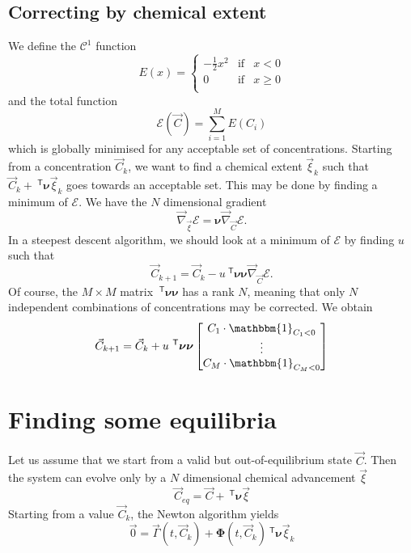 \documentclass[aps]{revtex4}
\newcommand{\mymat}[1]{\bm{#1}}
\newcommand{\mytrn}[1]{~^{\mathsf{T}}{#1}}
\newcommand{\mygrad}{\vec{\nabla}}
\begin{document}
\subsection{Correcting by chemical extent}
We define the $\mathcal{C}^1$ function
$$
	E(x) = \left\lbrace
	\begin{array}{rcl}
	-\frac{1}{2} x^2 & \text{if} & x<0\\
	0                & \text{if} & x\geq0\\
	\end{array}
	\right.
$$
and the total function
$$
	\mathcal{E}(\vec{C}) = \sum_{i=1}^M E(C_i)
$$
which is globally minimised for any acceptable set of concentrations.
Starting from a concentration $\vec{C}_k$, we want to find a chemical extent $\vec{\xi}_k$ such that
$\vec{C}_k + \mytrn{\mymat{\nu}}\vec{\xi}_k$ goes towards an acceptable set.
This may be done by finding a minimum of $\mathcal{E}$.
We have the $N$ dimensional gradient
$$
	\mygrad_{\vec{\xi}} \mathcal{E} = \mymat{\nu} \mygrad_{\vec{C}} \mathcal{E}.
$$
In a steepest descent algorithm, we should look at a minimum of $\mathcal{E}$
by finding $u$ such that
$$
	\vec{C}_{k+1} = \vec{C}_{k} - u \mytrn{\mymat{\nu}} \mymat{\nu} \mygrad_{\vec{C}} \mathcal{E}.
$$
Of course, the $M\times M$ matrix $\mytrn{\mymat{\nu}} \mymat{\nu}$ has a rank $N$, meaning that
only $N$ independent combinations of concentrations may be corrected.
We obtain
$$
	\vec{C}_{k+1} = \vec{C}_{k} + u \mytrn{\mymat{\nu}} \mymat{\nu}
	\begin{bmatrix}
	C_1 \cdot \mathbbm{1}_{C_1<0}\\
	\vdots\\
	C_M \cdot \mathbbm{1}_{C_M<0}\\
	\end{bmatrix} 
$$
\section{Finding some equilibria}

Let us assume that we start from a valid but out-of-equilibrium state $\vec{C}$.
Then the system can evolve only by a $N$ dimensional chemical advancement $\vec{\xi}$
\begin{equation}
	\vec{C}_{eq} = \vec{C} + \mytrn{\mymat{\nu}}\vec{\xi}
\end{equation}
Starting from a value $\vec{C}_{k}$, the Newton algorithm yields
\begin{equation}
	\vec{0} = \vec{\Gamma}(t,\vec{C}_k) + \mymat{\Phi}(t,\vec{C}_k) \mytrn{\mymat{\nu}}\vec{\xi}_k
\end{equation}
\end{document}
